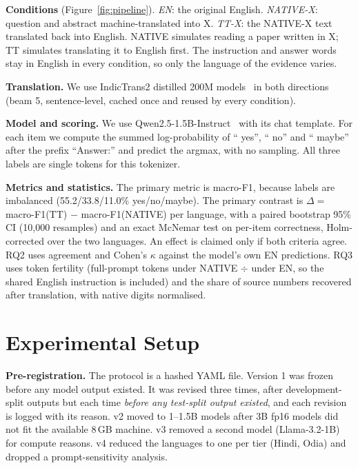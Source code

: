 \documentclass[acmsmall,nonacm]{acmart}
\begin{document}
\textbf{Conditions} (Figure~\ref{fig:pipeline}). \emph{EN}: the original English. \emph{NATIVE-X}: question and abstract machine-translated into X. \emph{TT-X}: the NATIVE-X text translated back into English. NATIVE simulates reading a paper written in X; TT simulates translating it to English first. The instruction and answer words stay in English in every condition, so only the language of the evidence varies.

\textbf{Translation.} We use IndicTrans2 distilled 200M models~\cite{gala2023indictrans2} in both directions (beam 5, sentence-level, cached once and reused by every condition).

\textbf{Model and scoring.} We use Qwen2.5-1.5B-Instruct~\cite{qwen2025qwen25} with its chat template. For each item we compute the summed log-probability of `` yes'', `` no'' and `` maybe'' after the prefix ``Answer:'' and predict the argmax, with no sampling. All three labels are single tokens for this tokenizer.

\textbf{Metrics and statistics.} The primary metric is macro-F1, because labels are imbalanced (55.2/33.8/11.0\% yes/no/maybe). The primary contrast is $\Delta = $ macro-F1(TT) $-$ macro-F1(NATIVE) per language, with a paired bootstrap 95\% CI (10,000 resamples) and an exact McNemar test on per-item correctness, Holm-corrected over the two languages. An effect is claimed only if both criteria agree. RQ2 uses agreement and Cohen's $\kappa$ against the model's own EN predictions. RQ3 uses token fertility (full-prompt tokens under NATIVE $\div$ under EN, so the shared English instruction is included) and the share of source numbers recovered after translation, with native digits normalised.

\section{Experimental Setup}

\textbf{Pre-registration.} The protocol is a hashed YAML file. Version 1 was frozen before any model output existed. It was revised three times, after development-split outputs but each time \emph{before any test-split output existed}, and each revision is logged with its reason. v2 moved to 1--1.5B models after 3B fp16 models did not fit the available 8\,GB machine. v3 removed a second model (Llama-3.2-1B) for compute reasons. v4 reduced the languages to one per tier (Hindi, Odia) and dropped a prompt-sensitivity analysis.
\end{document}
